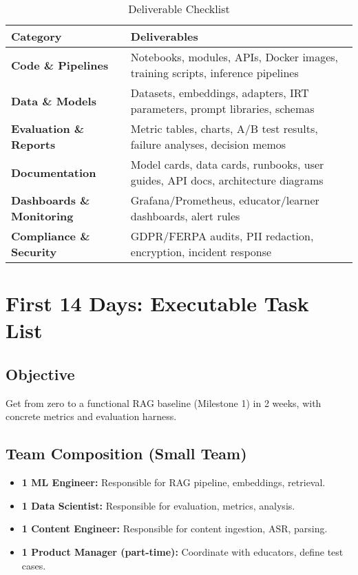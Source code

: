 \documentclass[11pt,letterpaper]{article}
\begin{document}
\begin{table}[H]
\centering
\small
\begin{tabular}{@{}p{5cm}p{9cm}@{}}
\toprule
\textbf{Category} & \textbf{Deliverables} \\
\midrule
\textbf{Code \& Pipelines} & Notebooks, modules, APIs, Docker images, training scripts, inference pipelines \\
\textbf{Data \& Models} & Datasets, embeddings, adapters, IRT parameters, prompt libraries, schemas \\
\textbf{Evaluation \& Reports} & Metric tables, charts, A/B test results, failure analyses, decision memos \\
\textbf{Documentation} & Model cards, data cards, runbooks, user guides, API docs, architecture diagrams \\
\textbf{Dashboards \& Monitoring} & Grafana/Prometheus, educator/learner dashboards, alert rules \\
\textbf{Compliance \& Security} & GDPR/FERPA audits, PII redaction, encryption, incident response \\
\bottomrule
\end{tabular}
\caption{Deliverable Checklist}
\end{table}

\newpage

\section{First 14 Days: Executable Task List}\label{sec:first-14-days}

\subsection{Objective}\label{subsec:first-14-objective}
Get from zero to a functional RAG baseline (Milestone 1) in 2 weeks, with concrete metrics and evaluation harness.

\subsection{Team Composition (Small Team)}\label{subsec:team-composition}
\begin{itemize}
\item \textbf{1 ML Engineer:} Responsible for RAG pipeline, embeddings, retrieval.
\item \textbf{1 Data Scientist:} Responsible for evaluation, metrics, analysis.
\item \textbf{1 Content Engineer:} Responsible for content ingestion, ASR, parsing.
\item \textbf{1 Product Manager (part-time):} Coordinate with educators, define test cases.
\end{itemize}
\end{document}
